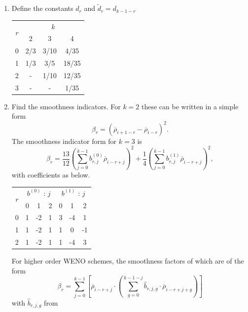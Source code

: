 \begin{enumerate}
	\item Define the constants $d_r$ and $\tilde d_r=d_{k-1-r}$
		\begin{center}
			\begin{tabular}{|c|ccc|}
				\hline
				\multirow{2}{*}{$r$} & \multicolumn{3}{c|}{$k$}\\
				& 2 & 3 & 4 \\
				\hline
				0 & 2/3 & 3/10 & 4/35\\
				1 & 1/3 & 3/5 & 18/35\\
				2 & - & 1/10 & 12/35\\
				3 & - & - & 1/35\\
				\hline
			\end{tabular}
		\end{center}
	
	\item Find the smoothness indicators. For $k=2$ these can be written in a simple form
		\begin{equation}
			\beta_r=\left(\overline\rho_{i+1-r}-\overline\rho_{i-r}\right)^2.
		\end{equation}
		The smoothness indicator form for $k=3$ is
		\begin{equation}
			\beta_r = \frac{13}{12}\left(\sum_{j=0}^{k-1}b^{(0)}_{r,j}\overline\rho_{i-r+j}\right)^2+\frac{1}{4}\left(\sum_{j=0}^{k-1}b^{(1)}_{r,j}\overline\rho_{i-r+j}\right)^2,
		\end{equation}
		with coefficients as below.
		\begin{center}
			\begin{tabular}{|c|ccc|ccc|}
				\hline
				 \multirow{2}{*}{$r$} & \multicolumn{3}{|c|}{$b^{(0)}$ : $j$} & \multicolumn{3}{|c|}{$b^{(1)}$ : $j$}\\
				 & 0 & 1 & 2 & 0 & 1 & 2\\
				 \hline
				 0 & 1 & -2 & 1 & 3 & -4 & 1\\
				 1 & 1 & -2 & 1 & 1 & 0 & -1\\
				 2 & 1 & -2 & 1 & 1 & -4 & 3\\
				\hline
			\end{tabular}
		\end{center}
		For higher order WENO schemes, the smoothness factors of which are of the form \cite{BalsaraShu00}
		\begin{equation}
			\beta_r = \sum^{k-1}_{j=0}\left[\overline\rho_{i-r+j}\cdot\left(\sum_{g=0}^{k-1-j}\hat{b}_{r,j,g}\cdot\overline\rho_{i-r+j+g}\right)\right]
		\end{equation}
		with $\hat{b}_{r,j,g}$ from

\end{enumerate}
